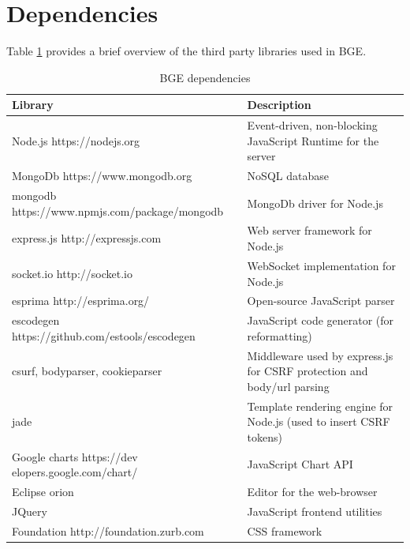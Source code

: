 \section{Dependencies}
Table \ref{table:dep} provides a brief overview of the third party libraries used in BGE.
\begin{table}
	\centering
    \begin{tabular}{ | p{5cm} | p{} | }
    \hline 
    \textbf{Library} & \textbf{Description} \\
    \hline  
      Node.js \newline https://nodejs.org & Event-driven, non-blocking JavaScript Runtime for the server\\
      \hline  
      MongoDb \newline https://www.mongodb.org  & NoSQL database \\
      \hline 
      mongodb \newline https://www.npmjs.com/\newline package/mongodb 
      & MongoDb driver for Node.js \\
      \hline  
      express.js \newline 
      http://expressjs.com
      & Web server framework for Node.js \\
      \hline 
            socket.io \newline 
      http://socket.io
      & WebSocket implementation for Node.js \\
      \hline 
      esprima \newline 
     http://esprima.org/
      & Open-source JavaScript parser \\
      \hline 
            escodegen \newline 
    https://github.com/\newline estools/escodegen
      & JavaScript code generator (for reformatting) \\
      \hline 
                csurf, bodyparser, cookieparser & Middleware used by express.js for CSRF protection and body/url parsing \\
      \hline 
       jade & Template rendering engine for Node.js (used to insert CSRF tokens) \\
      \hline 
       Google charts  https://dev elopers.google.com/chart/ & JavaScript Chart API \\
      \hline 
    Eclipse orion & Editor for the web-browser \\
      \hline 
          JQuery & JavaScript frontend utilities \\
      \hline
    Foundation \newline http://foundation.zurb.com & CSS framework \\
      \hline
      
    \end{tabular}
    	\caption{BGE dependencies }
    	\label{table:dep}
\end{table}

